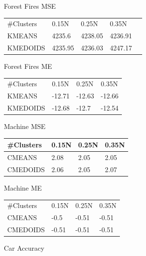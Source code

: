 \documentclass[twoside,11pt]{article}
\begin{document}
\begin{table}[ht]
	\begin{minipage}[b]{0.45\linewidth}\centering
			Forest Fires MSE
			\begin{tabular}{lllll}
				\cline{1-4}
				\#Clusters & 0.15N   & 0.25N   & 0.35N   &  \\ \cline{1-4}
				KMEANS     & 4235.6  & 4238.05 & 4236.91 &  \\
				KMEDOIDS   & 4235.95 & 4236.03 & 4247.17 &  \\
			\end{tabular}
	\end{minipage}
	\hspace{0.5cm}
	\begin{minipage}[b]{0.45\linewidth}
		Forest Fires ME
		\centering
		\begin{tabular}{llll}
			\cline{1-4}
			\#Clusters & 0.15N  & 0.25N  & 0.35N  \\ \cline{1-4}
			KMEANS     & -12.71 & -12.63 & -12.66 \\
			KMEDOIDS   & -12.68 & -12.7  & -12.54
		\end{tabular}
	\end{minipage}
	\begin{minipage}[b]{0.45\linewidth}\centering
		Machine MSE
		\begin{tabular}{llll}
			\hline
			\#Clusters & 0.15N & 0.25N & 0.35N \\ \hline
			CMEANS     & 2.08  & 2.05  & 2.05  \\
			CMEDOIDS   & 2.06  & 2.05  & 2.07
		\end{tabular}
	\end{minipage}
	\hspace{0.5cm}
	\begin{minipage}[b]{0.45\linewidth}
		Machine ME
		\centering
		\begin{tabular}{llll}
			 \cline{1-4}
			\#Clusters & 0.15N & 0.25N & 0.35N \\  \cline{1-4}
			CMEANS     & -0.5  & -0.51 & -0.51 \\
			CMEDOIDS   & -0.51 & -0.51 & -0.51
		\end{tabular}
	\end{minipage}
	\begin{minipage}[b]{0.45\linewidth}\centering
		Car Accuracy
		\begin{tabular}{llll}

\end{tabular}
\end{minipage}
\end{table}
\end{document}
